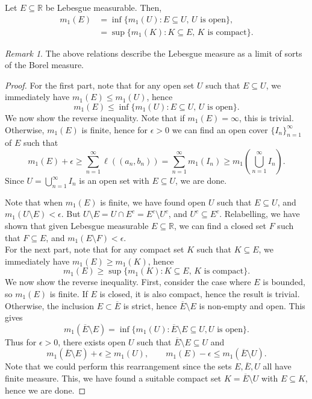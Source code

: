 \documentclass[11pt]{article}
\newcommand{\R}{\mathbb{R}}
\theoremstyle{definition}
\theoremstyle{remark}
\newtheorem*{remark}{Remark}
\numberwithin{equation}{section}
\begin{document}
    \begin{theorem}
        Let $E \subseteq \R$ be Lebesgue measurable. Then, \begin{align*}
            m_1(E) &= \inf\{m_1(U): E \subseteq U,\, U\text{ is open}\}, \\
            &= \sup\{m_1(K): K \subseteq E,\, K\text{ is compact}\}.
        \end{align*}
        \begin{remark}
            The above relations describe the Lebesgue measure as a limit of sorts of
            the Borel measure.
        \end{remark}
    \end{theorem}
    \begin{proof}
        For the first part, note that for any open set $U$ such that $E \subseteq U$,
        we immediately have $m_1(E) \leq m_1(U)$, hence \[
            m_1(E) \leq \inf\{m_1(U): E \subseteq U,\, U\text{ is open}\}.
        \] We now show the reverse inequality. Note that if $m_1(E) = \infty$, this
        is trivial. Otherwise, $m_1(E)$ is finite, hence for $\epsilon > 0$ we can
        find an open cover $\{I_n\}_{n = 1}^\infty$ of $E$ such that \[
            m_1(E) + \epsilon \geq \sum_{n = 1}^\infty \ell((a_n, b_n)) = \sum_{n =
            1}^\infty m_1(I_n) \geq m_1\left(\bigcup_{n = 1}^\infty I_n\right).
        \] Since $U = \bigcup_{n = 1}^\infty I_n$ is an open set with $E \subseteq
        U$, we are done.

        Note that when $m_1(E)$ is finite, we have found open $U$ such that $E
        \subseteq U$, and $m_1(U \setminus E) < \epsilon$. But $U\setminus E = U \cap
        E^c = E^c\setminus U^c$, and $U^c \subseteq E^c$. Relabelling, we have shown
        that given Lebesgue measurable $E \subseteq \R$, we can find a closed set $F$
        such that $F \subseteq E$, and $m_1(E \setminus F) < \epsilon$. \\

        For the next part, note that for any compact set $K$ such that $K \subseteq
        E$, we immediately have $m_1(E) \geq m_1(K)$, hence \[
            m_1(E) \geq \sup\{m_1(K): K \subseteq E,\, K\text{ is compact}\}.
        \] We now show the reverse inequality. First, consider the case where $E$ is
        bounded, so $m_1(E)$ is finite. If $E$ is closed, it is also compact, hence
        the result is trivial. Otherwise, the inclusion $E \subset \overline{E}$ is
        strict, hence $\overline{E}\setminus E$ is non-empty and open. This gives \[
            m_1(\overline{E}\setminus E) = \inf\{m_1(U): \overline{E}\setminus E
            \subseteq U, U\text{ is open}\}.
        \] Thus for $\epsilon > 0$, there exists open $U$ such that
        $\overline{E}\setminus E \subseteq U$ and \[
            m_1(\overline{E}\setminus E) + \epsilon \geq m_1(U), \qquad
            m_1(E) - \epsilon \leq m_1(\overline{E}\setminus U).
        \] Note that we could perform this rearrangement since the sets $E,
        \overline{E}, U$ all have finite measure. This, we have found a suitable
        compact set $K = \overline{E}\setminus U$ with $E \subseteq K$, hence we are
        done.


\end{proof}
\end{document}
